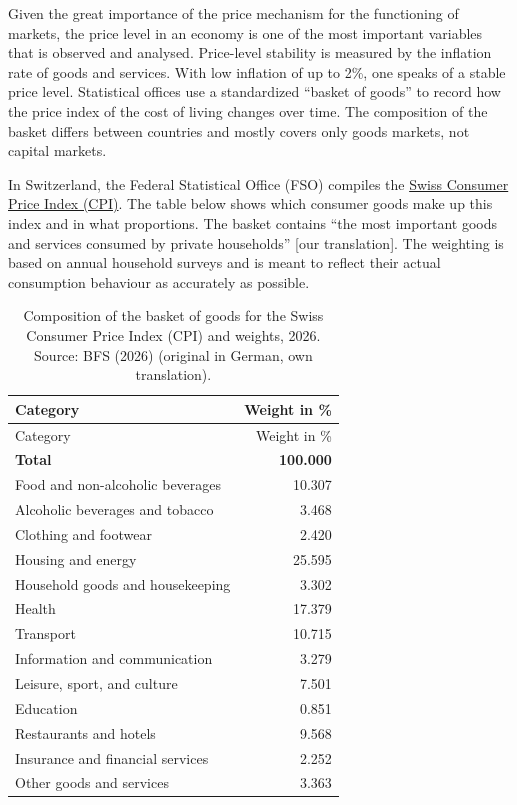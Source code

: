 \documentclass[
  british,
  a4paper,
  DIV=11,
  numbers=noendperiod,
  oneside,
  openany]{scrreprt}
\begin{document}
\begin{tcolorbox}[enhanced jigsaw, arc=.35mm, bottomrule=.15mm, bottomtitle=1mm, breakable, colback=white, colbacktitle=quarto-callout-tip-color!10!white, colframe=quarto-callout-tip-color-frame, coltitle=black, left=2mm, leftrule=.75mm, opacityback=0, opacitybacktitle=0.6, rightrule=.15mm, title={Excursus: Price level}, titlerule=0mm, toprule=.15mm, toptitle=1mm]

Given the great importance of the price mechanism for the functioning of
markets, the price level in an economy is one of the most important
variables that is observed and analysed. Price-level stability is
measured by the inflation rate of goods and services. With low inflation
of up to 2\%, one speaks of a stable price level. Statistical offices
use a standardized ``basket of goods'' to record how the price index of
the cost of living changes over time. The composition of the basket
differs between countries and mostly covers only goods markets, not
capital markets.

In Switzerland, the Federal Statistical Office (FSO) compiles the
\href{https://www.bfs.admin.ch/bfs/en/home/statistics/prices/surveys/lik.html}{Swiss
Consumer Price Index (CPI)}. The table below shows which consumer goods
make up this index and in what proportions. The basket contains ``the
most important goods and services consumed by private households''
{[}our translation{]}. The weighting is based on annual household
surveys and is meant to reflect their actual consumption behaviour as
accurately as possible.

\begin{longtable}[]{@{}lr@{}}
\caption{Composition of the basket of goods for the Swiss Consumer Price
Index (CPI) and weights, 2026. Source: BFS (2026) (original in German,
own translation).}\label{tbl-cpi-basket}\tabularnewline
\toprule\noalign{}
Category & Weight in \% \\
\midrule\noalign{}
\endfirsthead
\toprule\noalign{}
Category & Weight in \% \\
\midrule\noalign{}
\endhead
\bottomrule\noalign{}
\endlastfoot
\textbf{Total} & \textbf{100.000} \\
Food and non-alcoholic beverages & 10.307 \\
Alcoholic beverages and tobacco & 3.468 \\
Clothing and footwear & 2.420 \\
Housing and energy & 25.595 \\
Household goods and housekeeping & 3.302 \\
Health & 17.379 \\
Transport & 10.715 \\
Information and communication & 3.279 \\
Leisure, sport, and culture & 7.501 \\
Education & 0.851 \\
Restaurants and hotels & 9.568 \\
Insurance and financial services & 2.252 \\
Other goods and services & 3.363 \\
\end{longtable}


\end{tcolorbox}
\end{document}
